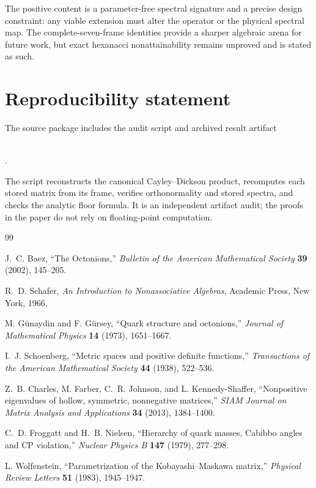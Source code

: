 \documentclass[11pt]{article}
\theoremstyle{remark}
\begin{document}
The positive content is a parameter-free spectral signature and a precise design constraint: any viable extension must alter the operator or the physical spectral map.  The complete-seven-frame identities provide a sharper algebraic arena for future work, but exact hexanacci nonattainability remains unproved and is stated as such.

\section*{Reproducibility statement}

The source package includes the audit script and archived result artifact
\begin{center}
\small
{}\\
.
\end{center}
The script reconstructs the canonical Cayley--Dickson product, recomputes each
stored matrix from its frame, verifies orthonormality and stored spectra, and
checks the analytic floor formula.  It is an independent artifact audit; the
proofs in the paper do not rely on floating-point computation.

\begin{thebibliography}{99}

J.~C. Baez,
``The Octonions,''
\emph{Bulletin of the American Mathematical Society} \textbf{39} (2002), 145--205.

R.~D. Schafer,
\emph{An Introduction to Nonassociative Algebras},
Academic Press, New York, 1966.

M. G\"unaydin and F. G\"ursey,
``Quark structure and octonions,''
\emph{Journal of Mathematical Physics} \textbf{14} (1973), 1651--1667.

I.~J. Schoenberg,
``Metric spaces and positive definite functions,''
\emph{Transactions of the American Mathematical Society} \textbf{44} (1938), 522--536.

Z.~B. Charles, M. Farber, C.~R. Johnson, and L. Kennedy-Shaffer,
``Nonpositive eigenvalues of hollow, symmetric, nonnegative matrices,''
\emph{SIAM Journal on Matrix Analysis and Applications} \textbf{34} (2013), 1384--1400.

C.~D. Froggatt and H.~B. Nielsen,
``Hierarchy of quark masses, Cabibbo angles and CP violation,''
\emph{Nuclear Physics B} \textbf{147} (1979), 277--298.

L. Wolfenstein,
``Parametrization of the Kobayashi--Maskawa matrix,''
\emph{Physical Review Letters} \textbf{51} (1983), 1945--1947.

\end{thebibliography}
\end{document}
